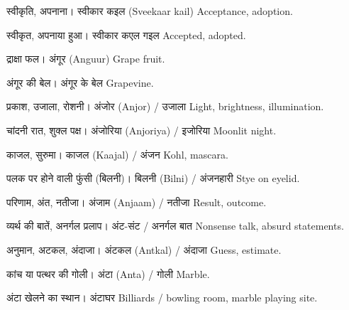 %
{स्वीकृति, अपनाना।}%
{स्वीकार कइल (Sveekaar kail)}%
{Acceptance, adoption.}

%
{स्वीकृत, अपनाया हुआ।}%
{स्वीकार कएल गइल}%
{Accepted, adopted.}

%
{द्राक्षा फल।}%
{अंगूर (Anguur)}%
{Grape fruit.}

%
{अंगूर की बेल।}%
{अंगूर के बेल}%
{Grapevine.}

%
{प्रकाश, उजाला, रोशनी।}%
{अंजोर (Anjor) / उजाला}%
{Light, brightness, illumination.}

%
{चांदनी रात, शुक्ल पक्ष।}%
{अंजोरिया (Anjoriya) / इजोरिया}%
{Moonlit night.}

%
{काजल, सुरुमा।}%
{काजल (Kaajal) / अंजन}%
{Kohl, mascara.}

%
{पलक पर होने वाली फुंसी (बिलनी)।}%
{बिलनी (Bilni) / अंजनहारी}%
{Stye on eyelid.}

%
{परिणाम, अंत, नतीजा।}%
{अंजाम (Anjaam) / नतीजा}%
{Result, outcome.}

%
{व्यर्थ की बातें, अनर्गल प्रलाप।}%
{अंट-संट / अनर्गल बात}%
{Nonsense talk, absurd statements.}

%
{अनुमान, अटकल, अंदाजा।}%
{अंटकल (Antkal) / अंदाजा}%
{Guess, estimate.}

%
{कांच या पत्थर की गोली।}%
{अंटा (Anta) / गोली}%
{Marble.}

%
{अंटा खेलने का स्थान।}%
{अंटाघर}%
{Billiards / bowling room, marble playing site.}

